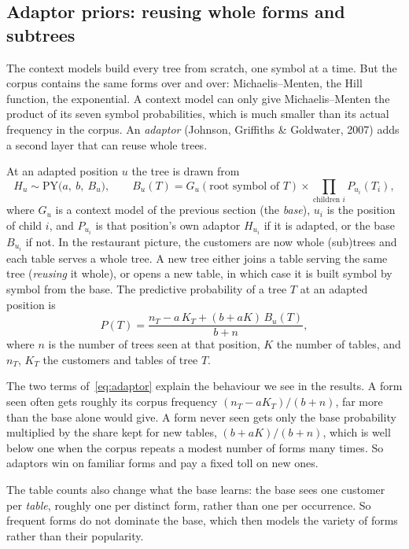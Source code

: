 \documentclass[11pt]{article}
\newcommand{\PY}{\mathrm{PY}}
\begin{document}
\subsection{Adaptor priors: reusing whole forms and subtrees}\label{sec:adaptors}

The context models build every tree from scratch, one symbol at a time. But the corpus contains the same
forms over and over: Michaelis--Menten, the Hill function, the exponential. A context model can only
give Michaelis--Menten the product of its seven symbol probabilities, which is much smaller than its
actual frequency in the corpus. An \emph{adaptor} (Johnson, Griffiths \& Goldwater, 2007) adds a second
layer that can reuse whole trees.

At an adapted position $u$ the tree is drawn from
\[
  H_u \sim \PY\big(a,\ b,\ B_u\big), \qquad
  B_u(T) = G_u(\text{root symbol of } T) \times \prod_{\text{children } i} P_{u_i}(T_i),
\]
where $G_u$ is a context model of the previous section (the \emph{base}), $u_i$ is the position of
child $i$, and $P_{u_i}$ is that position's own adaptor $H_{u_i}$ if it is adapted, or the base
$B_{u_i}$ if not. In the restaurant picture, the customers are now whole (sub)trees and each table
serves a whole tree. A new tree either joins a table serving the same tree (\emph{reusing} it whole), or
opens a new table, in which case it is built symbol by symbol from the base. The predictive probability
of a tree $T$ at an adapted position is
\begin{equation}\label{eq:adaptor}
  P(T) = \frac{n_T - a\, K_T + (b + a K)\, B_u(T)}{b + n},
\end{equation}
where $n$ is the number of trees seen at that position, $K$ the number of tables, and $n_T$, $K_T$ the
customers and tables of tree $T$.

The two terms of~\eqref{eq:adaptor} explain the behaviour we see in the results. A form seen often gets
roughly its corpus frequency $(n_T - aK_T)/(b+n)$, far more than the base alone would give. A form never
seen gets only the base probability multiplied by the share kept for new tables,
$(b + aK)/(b + n)$, which is well below one when the corpus repeats a modest number of forms many
times. So adaptors win on familiar forms and pay a fixed toll on new ones.

The table counts also change what the base learns: the base sees one customer per \emph{table}, roughly
one per distinct form, rather than one per occurrence. So frequent forms do not dominate the base, which
then models the variety of forms rather than their popularity.
\end{document}

